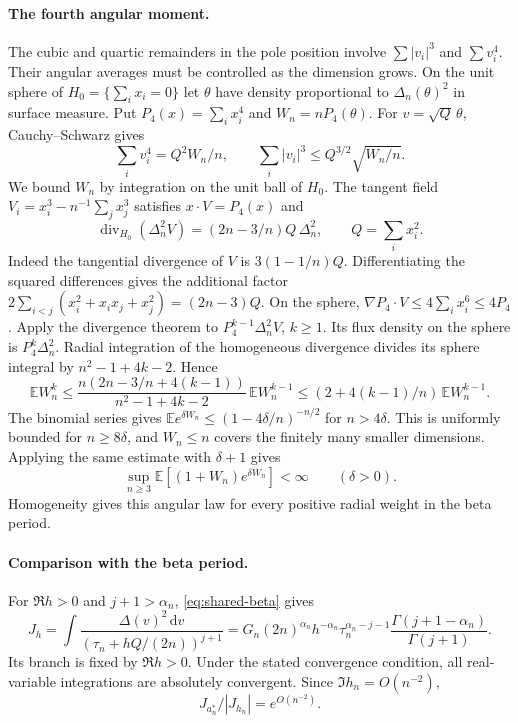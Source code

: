 \documentclass[11pt]{article}
\numberwithin{equation}{section}
\theoremstyle{definition}
\newcommand{\dd}{\,\mathrm d}
\begin{document}
\paragraph{The fourth angular moment.}
The cubic and quartic remainders in the pole position involve
$\sum|v_i|^3$ and $\sum v_i^4$. Their angular averages must be
controlled as the dimension grows. On the unit sphere of
$H_0=\{\sum_i x_i=0\}$ let $\theta$ have density
proportional to $\Delta_n(\theta)^2$ in surface measure. Put
$P_4(x)=\sum_i x_i^4$ and $W_n=nP_4(\theta)$. For $v=\sqrt Q\,\theta$,
Cauchy--Schwarz gives
\begin{equation}
 \sum_i v_i^4=Q^2W_n/n,\qquad
 \sum_i|v_i|^3\le Q^{3/2}\sqrt{W_n/n}.                 \label{neg:new:powers}
\end{equation}
We bound $W_n$ by integration on the unit ball of $H_0$.
The tangent field $V_i=x_i^3-n^{-1}\sum_j x_j^3$ satisfies
$x\cdot V=P_4(x)$ and
\[
 \operatorname{div}_{H_0}(\Delta_n^2 V)=(2n-3/n)Q\,\Delta_n^2,
 \qquad Q=\sum_i x_i^2 .
\]
Indeed the tangential divergence of $V$ is $3(1-1/n)Q$.
Differentiating the squared differences gives the additional factor
$2\sum_{i<j}(x_i^2+x_ix_j+x_j^2)=(2n-3)Q$.
On the sphere, $\nabla P_4\cdot V\le4\sum_i x_i^6\le4P_4$.
Apply the divergence theorem to $P_4^{k-1}\Delta_n^2 V$, $k\ge1$.
Its flux density on the sphere is $P_4^k\Delta_n^2$. Radial
integration of the homogeneous divergence divides its sphere integral
by $n^2-1+4k-2$. Hence
\[
 \mathbb E W_n^k\le
 \frac{n(2n-3/n+4(k-1))}{n^2-1+4k-2}\,\mathbb E W_n^{k-1}
 \le(2+4(k-1)/n)\,\mathbb E W_n^{k-1}.
\]
The binomial series gives $\mathbb E e^{\delta W_n}\le
(1-4\delta/n)^{-n/2}$ for $n>4\delta$. This is uniformly bounded
for $n\ge8\delta$, and $W_n\le n$ covers the finitely many smaller
dimensions. Applying the same estimate with $\delta+1$ gives
\begin{equation}\label{neg:new:moment}
 \sup_{n\ge3}\mathbb E[(1+W_n)e^{\delta W_n}]<\infty
 \qquad(\delta>0).
\end{equation}
Homogeneity gives this angular law for every positive radial weight
in the beta period.

\paragraph{Comparison with the beta period.}
For $\Re h>0$ and $j+1>\alpha_n$, \eqref{eq:shared-beta} gives
\begin{equation}
 J_h=\int\frac{\Delta(v)^2\dd v}{(\tau_n+hQ/(2n))^{j+1}}
 =G_n(2n)^{\alpha_n}h^{-\alpha_n}\tau_n^{\alpha_n-j-1}
                     \frac{\Gamma(j+1-\alpha_n)}{\Gamma(j+1)}.
                                                        \label{neg:new:complexbeta}
\end{equation}
Its branch is fixed by $\Re h>0$.  Under the stated convergence
condition, all real-variable integrations are absolutely convergent.  Since $\Im h_n=O(n^{-2})$,
\begin{equation}
                   J_{a_n^*}/|J_{h_n}|=e^{O(n^{-2})}.   \label{neg:new:majorantcost}
\end{equation}
\end{document}
